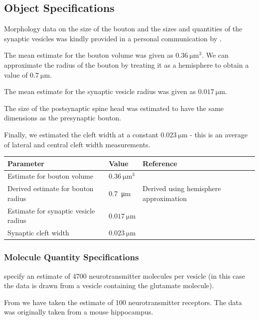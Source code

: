 \documentclass[a4paper]{article}
\begin{document}
\subsection{Object Specifications}
Morphology data on the size of the bouton and the sizes and quantities of the synaptic vesicles was kindly provided in a personal communication by \cite{Rollehagen::2015}. 

The mean estimate for the bouton volume was given as $\SI{0.36}{\micro\meter\cubed}$. We can approximate the radius of the bouton by treating it as a hemisphere to obtain a value of $\SI{0.7}{\micro\metre}$. 

The mean estimate for the synaptic vesicle radius was given as $\SI{0.017}{\micro\meter}$.

The size of the postsynaptic spine head was estimated to have the same dimensions as the presynaptic bouton.

Finally, we estimated the cleft width at a constant $\SI{0.023}{\micro\meter}$ - this is an average of lateral and central cleft width measurements.

\begin{table}[H]
\begin{tabular}{lll}
Parameter & Value & Reference \\ \hline
Estimate for bouton volume&  $\SI{0.36}{\micro\meter\cubed}$& \cite{Rollehagen::2015} \\ 
Derived estimate for bouton radius & \SI{0.7}{\micro\meter} & Derived using hemisphere approximation\\
Estimate for synaptic vesicle radius & $\SI{0.017}{\micro\meter}$ & \cite{Rollehagen::2015}\\ 
Synaptic cleft width &$\SI{0.023}{\micro\meter}$& \cite{Rollehagen::2015}\\
\end{tabular}
\end{table}

\subsubsection{Molecule Quantity Specifications}
\cite{Bruns:Nature:1995} specify an estimate of 4700 neurotransmitter molecules per vesicle (in this case the data is drawn from a vesicle containing the glutamate molecule).

From \cite{Stricker:JPhysiol:1996} we have taken the estimate of 100 neurotransmitter receptors. The data was originally taken from a mouse hippocampus.
\end{document}
